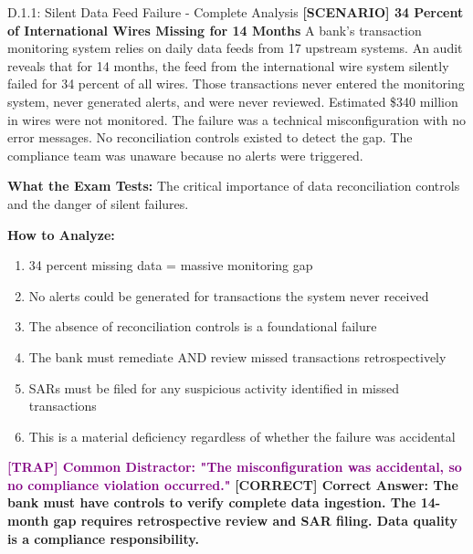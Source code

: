 \documentclass[11pt,a4paper]{beamer}
\newcommand{\trap}[1]{\textcolor{purple}{\textbf{[TRAP] #1}}}
\newcommand{\correct}[1]{\textcolor{green!50!black}{\textbf{[CORRECT] #1}}}
\newcommand{\scenario}[1]{\textcolor{blue!70!black}{\textbf{[SCENARIO] #1}}}
\begin{document}
\begin{frame}{D.1.1: Silent Data Feed Failure - Complete Analysis}
	\scenario{34 Percent of International Wires Missing for 14 Months}
	A bank's transaction monitoring system relies on daily data feeds from 17 upstream systems. An audit reveals that for 14 months, the feed from the international wire system silently failed for 34 percent of all wires. Those transactions never entered the monitoring system, never generated alerts, and were never reviewed. Estimated \$340 million in wires were not monitored. The failure was a technical misconfiguration with no error messages. No reconciliation controls existed to detect the gap. The compliance team was unaware because no alerts were triggered.
	
	\vspace{0.1cm}
	\textbf{What the Exam Tests:} The critical importance of data reconciliation controls and the danger of silent failures.
	
	\vspace{0.1cm}
	\textbf{How to Analyze:}
	\begin{enumerate}
		\item 34 percent missing data = massive monitoring gap
		\item No alerts could be generated for transactions the system never received
		\item The absence of reconciliation controls is a foundational failure
		\item The bank must remediate AND review missed transactions retrospectively
		\item SARs must be filed for any suspicious activity identified in missed transactions
		\item This is a material deficiency regardless of whether the failure was accidental
	\end{enumerate}
	
	\trap{Common Distractor: "The misconfiguration was accidental, so no compliance violation occurred."}
	\correct{Correct Answer: The bank must have controls to verify complete data ingestion. The 14-month gap requires retrospective review and SAR filing. Data quality is a compliance responsibility.}
\end{frame}
\end{document}
